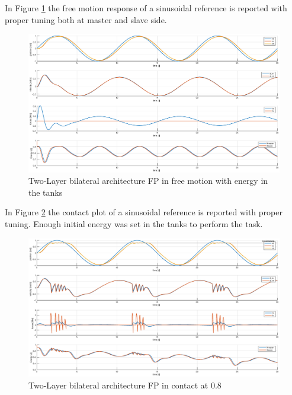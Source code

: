 \documentclass[a4paper,12pt]{article}
\begin{document}
\bigskip
In Figure \ref{fig:energy_pf_free} the free motion response of a sinusoidal reference is reported with proper tuning both at master and slave side.

\begin{figure}[H]
    \begin{center}
        \hspace*{-4.5cm}
        \includegraphics[scale=0.5]{images/energy_pf_free.eps}
    \end{center}
    \caption{Two-Layer bilateral architecture FP in free motion with energy in the tanks}
    \label{fig:energy_pf_free}
\end{figure}

\newpage
In Figure \ref{fig:energy_pf_contact} the contact plot of a sinusoidal reference is reported with proper tuning. Enough initial energy was set in the tanks to perform the task.

\begin{figure}[H]
    \begin{center}
        \hspace*{-4.5cm}
        \includegraphics[scale=0.5]{images/energy_pf_contact.eps}
    \end{center}
    \caption{Two-Layer bilateral architecture FP in contact at 0.8}
    \label{fig:energy_pf_contact}
\end{figure}
\end{document}
